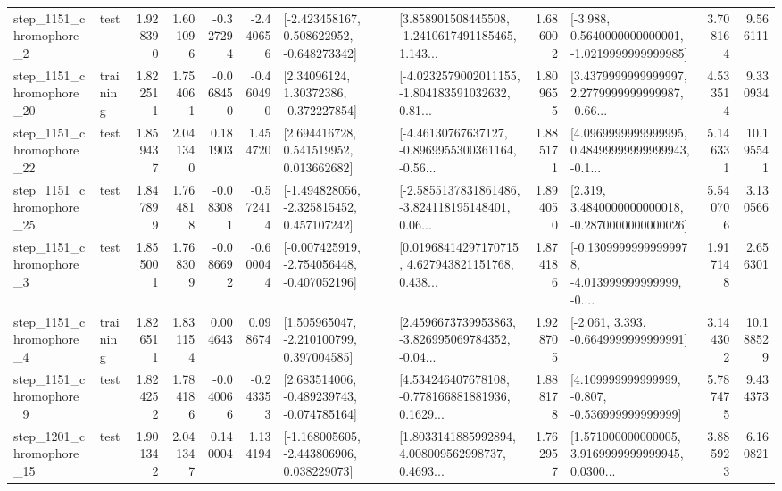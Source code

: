 \begin{tabular}{llrrrrllrlrr}
  step\_1151\_chromophore\_2 &      test &      1.928390 &    1.601096 &     -0.327294 & -2.440656 &   [-2.423458167, 0.508622952, -0.648273342] &  [3.858901508445508, -1.2410617491185465, 1.143... &       1.686002 &  [-3.988, 0.5640000000000001, -1.0219999999999985] &            3.708164 &          9.566111 \\
 step\_1151\_chromophore\_20 &  training &      1.822511 &    1.754061 &     -0.068450 & -0.460490 &      [2.34096124, 1.30372386, -0.372227854] &  [-4.0232579002011155, -1.804183591032632, 0.81... &       1.809655 &  [3.4379999999999997, 2.2779999999999987, -0.66... &            4.533514 &          9.330934 \\
 step\_1151\_chromophore\_22 &      test &      1.859437 &    2.041340 &      0.181903 &  1.454720 &     [2.694416728, 0.541519952, 0.013662682] &  [-4.46130767637127, -0.8969955300361164, -0.56... &       1.885171 &  [4.0969999999999995, 0.48499999999999943, -0.1... &            5.146331 &         10.195541 \\
 step\_1151\_chromophore\_25 &      test &      1.847899 &    1.764818 &     -0.083081 & -0.572414 &   [-1.494828056, -2.325815452, 0.457107242] &  [-2.5855137831861486, -3.824118195148401, 0.06... &       1.894050 &   [2.319, 3.4840000000000018, -0.2870000000000026] &            5.540706 &          3.130566 \\
  step\_1151\_chromophore\_3 &      test &      1.855001 &    1.768309 &     -0.086692 & -0.600044 &  [-0.007425919, -2.754056448, -0.407052196] &  [0.01968414297170715, 4.627943821151768, 0.438... &       1.874186 &  [-0.13099999999999978, -4.013999999999999, -0.... &            1.917148 &          2.656301 \\
  step\_1151\_chromophore\_4 &  training &      1.826511 &    1.831154 &      0.004643 &  0.098674 &    [1.505965047, -2.210100799, 0.397004585] &  [2.4596673739953863, -3.826995069784352, -0.04... &       1.928705 &               [-2.061, 3.393, -0.6649999999999991] &            3.144302 &         10.188529 \\
  step\_1151\_chromophore\_9 &      test &      1.824252 &    1.784186 &     -0.040066 & -0.243353 &   [2.683514006, -0.489239743, -0.074785164] &  [4.534246407678108, -0.778166881881936, 0.1629... &       1.888178 &    [4.109999999999999, -0.807, -0.536999999999999] &            5.787475 &          9.434373 \\
 step\_1201\_chromophore\_15 &      test &      1.901342 &    2.041347 &      0.140004 &  1.134194 &   [-1.168005605, -2.443806906, 0.038229073] &  [1.8033141885992894, 4.008009562998737, 0.4693... &       1.762957 &  [1.571000000000005, 3.9169999999999945, 0.0300... &            3.885923 &          6.160821 \\

\end{tabular}
